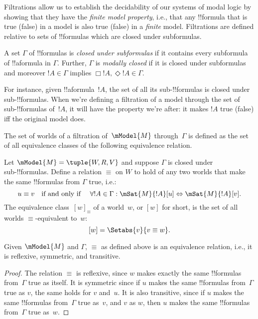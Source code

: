 \documentclass[../../../include/open-logic-section]{subfiles}
\begin{document}

Filtrations allow us to establish the decidability of our systems of
modal logic by showing that they have the \emph{finite model
  property}, i.e., that any !!{formula} that is true (false) in a
model is also true (false) in a \emph{finite} model.  Filtrations are
defined relative to sets of !!{formula}s which are closed under
subformulas.

\begin{defn}
  A set $\Gamma$ of !!{formula}s is \emph{closed under subformulas} if it
  contains every subformula of !!a{formula} in $\Gamma$. Further,
  $\Gamma$ is \emph{modally closed} if it is closed under subformulas
  and moreover $!A \in \Gamma$ implies $\Box!A,
  \Diamond!A \in \Gamma$. 
\end{defn}

For instance, given !!a{formula}~$!A$, the set of all its
sub-!!{formula}s is closed under sub-!!{formula}s. When we're defining
a filtration of a model through the set of sub-!!{formula}s of~$!A$,
it will have the property we're after: it makes $!A$ true (false) iff
the original model does.

The set of worlds of a filtration of~$\mModel{M}$ through~$\Gamma$ is
defined as the set of all equivalence classes of the following
equivalence relation.

\begin{defn}
Let $\mModel{M} =\tuple{W, R, V}$ and suppose $\Gamma$ is closed under
sub-!!{formula}s. Define a relation $\equiv$ on $W$ to hold of any two
worlds that make the same !!{formula}s from $\Gamma$ true, i.e.:
\[
u \equiv v \quad \text{if and only if } \quad 
\forall !A \in \Gamma : \mSat{M}{!A}[u] \Leftrightarrow \mSat{M}{!A}[v].
\]
The equivalence class~$[w]_\equiv$ of a world~$w$, or $[w]$ for short,
is the set of all worlds $\equiv$-equivalent to~$w$:
\[
[w] = \Setabs{v}{v \equiv w}.
\]
\end{defn}

\begin{prop}
  Given $\mModel{M}$ and $\Gamma$, $\equiv$ as defined above is an
  equivalence relation, i.e., it is reflexive, symmetric, and
  transitive.
\end{prop}

\begin{proof}
  The relation $\equiv$ is reflexive, since $w$ makes exactly the same
  !!{formula}s from~$\Gamma$ true as itself. It is symmetric since if
  $u$ makes the same !!{formula}s from~$\Gamma$ true as $v$, the same
  holds for $v$ and~$u$. It is also transitive, since if $u$ makes the
  same !!{formula}s from~$\Gamma$ true as~$v$, and $v$ as $w$, then
  $u$ makes the same !!{formula}s from~$\Gamma$ true as~$w$.
\end{proof}
\end{document}
